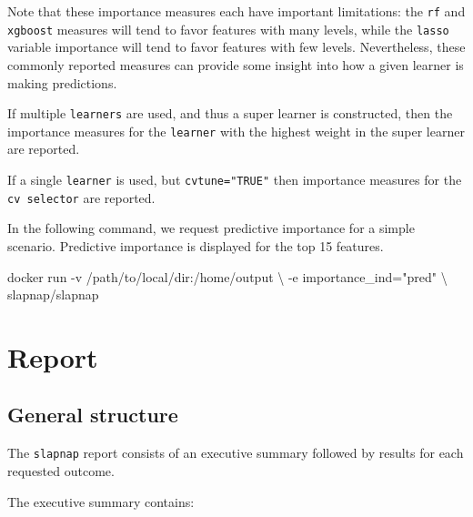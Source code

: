 \documentclass[]{article}
\newenvironment{Shaded}{\begin{snugshade}}{\end{snugshade}}
\newcommand{\StringTok}[1]{\textcolor[rgb]{0.31,0.60,0.02}{#1}}
\newcommand{\ExtensionTok}[1]{#1}
\newcommand{\NormalTok}[1]{#1}
\begin{document}
Note that these importance measures each have important limitations: the
\texttt{rf} and \texttt{xgboost} measures will tend to favor features
with many levels, while the \texttt{lasso} variable importance will tend
to favor features with few levels. Nevertheless, these commonly reported
measures can provide some insight into how a given learner is making
predictions.

If multiple \texttt{learners} are used, and thus a super learner is
constructed, then the importance measures for the \texttt{learner} with
the highest weight in the super learner are reported.

If a single \texttt{learner} is used, but \texttt{cvtune="TRUE"} then
importance measures for the \texttt{cv\ selector} are reported.

In the following command, we request predictive importance for a simple
scenario. Predictive importance is displayed for the top 15 features.

\begin{Shaded}
\begin{Highlighting}[]
\ExtensionTok{docker}\NormalTok{ run -v /path/to/local/dir:/home/output \textbackslash{}}
\NormalTok{           -e importance_ind=}\StringTok{"pred"}\NormalTok{ \textbackslash{}}
\NormalTok{           slapnap/slapnap}
\end{Highlighting}
\end{Shaded}

\section{Report}\label{sec:report}

\subsection{General structure}\label{general-structure}

The \texttt{slapnap} report consists of an executive summary followed by
results for each requested outcome.

The executive summary contains:
\end{document}
